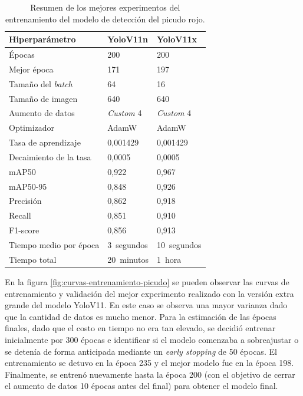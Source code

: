 \begin{table}[H]
    \centering
    \caption[Experimentos modelo detección del picudo rojo]{Resumen de los mejores experimentos del entrenamiento del modelo de detección del picudo rojo.}
    \begin{tabular}{ l l l }
        \toprule
        \textbf{Hiperparámetro}   & \textbf{YoloV11n} & \textbf{YoloV11x} \\
        \midrule
        Épocas                    & 200               & 200               \\
        Mejor época               & 171               & 197               \\
        Tamaño del \textit{batch} & 64                & 16                \\
        Tamaño de imagen          & 640               & 640               \\
        Aumento de datos          & \textit{Custom} 4 & \textit{Custom} 4 \\
        Optimizador               & AdamW             & AdamW             \\
        Tasa de aprendizaje       & 0,001429          & 0,001429          \\
        Decaimiento de la tasa    & 0,0005            & 0,0005            \\
        mAP50                     & 0,922             & 0,967             \\
        mAP50-95                  & 0,848             & 0,926             \\
        Precisión                 & 0,862             & 0,918             \\
        Recall                    & 0,851             & 0,910             \\
        F1-score                  & 0,856             & 0,913             \\
        Tiempo medio por época    & \SI{3}{segundos}  & \SI{10}{segundos} \\
        Tiempo total              & \SI{20}{minutos}  & \SI{1}{hora}      \\
        \bottomrule
        \hline
    \end{tabular}
    \label{tab:experimentos-picudo-rojo}
\end{table}

En la figura \ref{fig:curvas-entrenamiento-picudo} se pueden observar las curvas de entrenamiento y validación del mejor experimento realizado con la versión extra grande del modelo YoloV11. En este caso se observa una mayor varianza dado que la cantidad de datos es mucho menor. Para la estimación de las épocas finales, dado que el costo en tiempo no era tan elevado, se decidió entrenar inicialmente por 300 épocas e identificar si el modelo comenzaba a sobreajustar o se detenía de forma anticipada mediante un \textit{early stopping} de 50 épocas. El entrenamiento se detuvo en la época 235 y el mejor modelo fue en la época 198. Finalmente, se entrenó nuevamente hasta la época 200 (con el objetivo de cerrar el aumento de datos 10 épocas antes del final) para obtener el modelo final.

